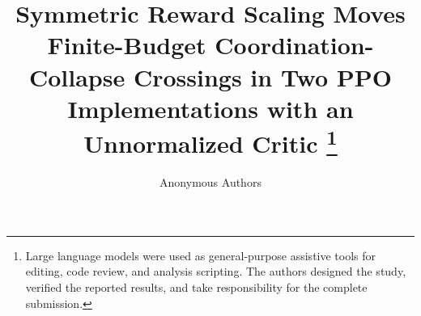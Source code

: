 \documentclass[10pt]{article}
\title{Symmetric Reward Scaling Moves Finite-Budget Coordination-Collapse Crossings in Two PPO Implementations with an Unnormalized Critic%
\thanks{Large language models were used as general-purpose assistive tools for editing, code review, and analysis scripting. The authors designed the study, verified the reported results, and take responsibility for the complete submission.}}
\author{Anonymous Authors}
\begin{document}
\maketitle

\begin{abstract}

\end{abstract}






\clearpage
\appendix

\end{document}
